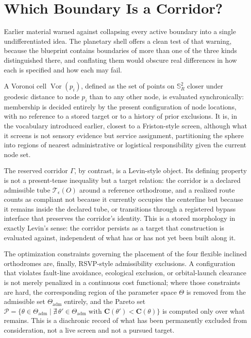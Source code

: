 \documentclass[11pt,fleqn]{book}
\numberwithin{equation}{chapter}
\theoremstyle{plain}
\theoremstyle{definition}
\theoremstyle{remark}
\newcommand{\Sphere}{\mathbb{S}^{2}}
\newcommand{\Vor}{\operatorname{Vor}}
\providecommand{\Tset}{\mathcal{T}}
\begin{document}
\section{Which Boundary Is a Corridor?}

Earlier material warned against collapsing every active boundary into a single undifferentiated idea. The planetary shell offers a clean test of that warning, because the blueprint contains boundaries of more than one of the three kinds distinguished there, and conflating them would obscure real differences in how each is specified and how each may fail.

A Voronoi cell \(\Vor(p_i)\), defined as the set of points on \(\Sphere_R\) closer under geodesic distance to node \(p_i\) than to any other node, is evaluated synchronically: membership is decided entirely by the present configuration of node locations, with no reference to a stored target or to a history of prior exclusions. It is, in the vocabulary introduced earlier, closest to a Friston-style screen, although what it screens is not sensory evidence but service assignment, partitioning the sphere into regions of nearest administrative or logistical responsibility given the current node set.

The reserved corridor \(\Gamma\), by contrast, is a Levin-style object. Its defining property is not a present-tense inequality but a target relation: the corridor is a declared admissible tube \(\Tset_\epsilon(O)\) around a reference orthodrome, and a realized route counts as compliant not because it currently occupies the centerline but because it remains inside the declared tube, or transitions through a registered bypass interface that preserves the corridor's identity. This is a stored morphology in exactly Levin's sense: the corridor persists as a target that construction is evaluated against, independent of what has or has not yet been built along it.

The optimization constraints governing the placement of the four flexible inclined orthodromes are, finally, RSVP-style admissibility exclusions. A configuration that violates fault-line avoidance, ecological exclusion, or orbital-launch clearance is not merely penalized in a continuous cost functional; where those constraints are hard, the corresponding region of the parameter space \(\Theta\) is removed from the admissible set \(\Theta_{\mathrm{adm}}\) entirely, and the Pareto set \(\mathcal P=\{\theta\in\Theta_{\mathrm{adm}}\mid \nexists\,\theta'\in\Theta_{\mathrm{adm}}\text{ with }\mathbf C(\theta')<\mathbf C(\theta)\}\) is computed only over what remains. This is a diachronic record of what has been permanently excluded from consideration, not a live screen and not a pursued target.
\end{document}
